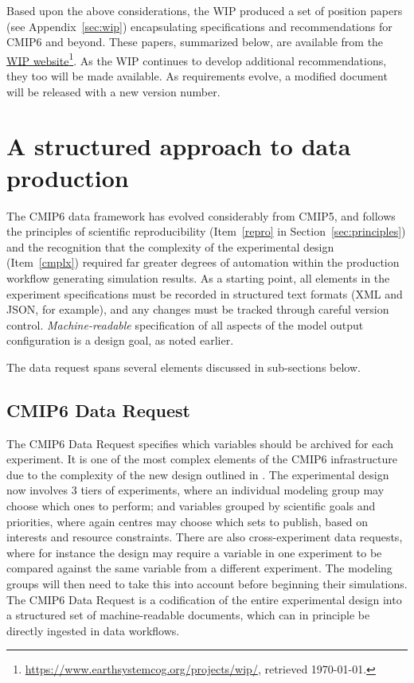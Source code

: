 \documentclass[gmd,manuscript]{copernicus}
\newcommand{\urlref}[2] {\href{#1}{#2}\footnote{\url{#1}, retrieved \today.}}
\begin{document}
Based upon the above considerations, the WIP produced a set of position
papers (see Appendix~\ref{sec:wip}) encapsulating specifications and
recommendations for CMIP6 and beyond. These papers, summarized below,
are available from the
\urlref{https://www.earthsystemcog.org/projects/wip/}{WIP website}. As
the WIP continues to develop additional recommendations, they too will
be made available. As requirements evolve, a modified document will
be released with a new version number.

\section{A structured approach to data production}
\label{sec:dreq}

The CMIP6 data framework has evolved considerably from CMIP5, and
follows the principles of scientific reproducibility (Item~\ref{repro}
in Section~\ref{sec:principles}) and the recognition that the
complexity of the experimental design (Item~\ref{cmplx}) required far
greater degrees of automation within the production workflow generating 
simulation results. As a starting point, 
 all elements in the experiment specifications must be recorded in
structured text formats (XML and JSON, for example), and any changes
must be tracked through careful version control. \emph{Machine-readable} specification of all
 aspects of the model output configuration is a
design goal, as noted earlier.

The data request spans several elements discussed in sub-sections
below.

\subsection{CMIP6 Data Request}
\label{sec:data-request}

The CMIP6 Data Request specifies which variables should be archived for
each experiment.  It is one of the most complex elements of the
CMIP6 infrastructure due to the complexity of the
new design outlined in \cite{ref:eyringetal2016a}. The experimental
design now involves 3 tiers of experiments, where an individual
modeling group may choose which ones to perform; and variables grouped
by scientific goals and priorities, where again centres may choose
which sets to publish, based on interests and resource constraints.
There are also cross-experiment data requests, where for instance the
design may require a variable in one experiment to be compared against
the same variable from a different experiment. The modeling groups
will then need to take this into account before beginning their
simulations. The CMIP6 Data Request is a codification of the entire
experimental design into a structured set of machine-readable
documents, which can in principle be directly ingested in data
workflows.
\end{document}

